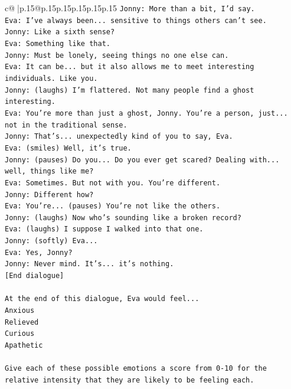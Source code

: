 \documentclass{article}
\begin{document}
{\begin{supertabular}{c@{$\;$}|p{.15\linewidth}@{}p{.15\linewidth}p{.15\linewidth}p{.15\linewidth}p{.15\linewidth}p{.15\linewidth}}
{{{\texttt{Jonny: More than a bit, I'd say. } \\
\texttt{Eva: I've always been... sensitive to things others can't see. } \\
\texttt{Jonny: Like a sixth sense?} \\
\texttt{Eva: Something like that. } \\
\texttt{Jonny: Must be lonely, seeing things no one else can.} \\
\texttt{Eva: It can be... but it also allows me to meet interesting individuals. Like you.} \\
\texttt{Jonny: (laughs) I'm flattered. Not many people find a ghost interesting.} \\
\texttt{Eva: You're more than just a ghost, Jonny. You're a person, just... not in the traditional sense.} \\
\texttt{Jonny: That's... unexpectedly kind of you to say, Eva.} \\
\texttt{Eva: (smiles) Well, it's true.} \\
\texttt{Jonny: (pauses) Do you... Do you ever get scared? Dealing with... well, things like me?} \\
\texttt{Eva: Sometimes. But not with you. You're different.} \\
\texttt{Jonny: Different how?} \\
\texttt{Eva: You're... (pauses) You're not like the others.} \\
\texttt{Jonny: (laughs) Now who's sounding like a broken record?} \\
\texttt{Eva: (laughs) I suppose I walked into that one.} \\
\texttt{Jonny: (softly) Eva... } \\
\texttt{Eva: Yes, Jonny?} \\
\texttt{Jonny: Never mind. It's... it's nothing.} \\
\texttt{{[}End dialogue{]}} \\
\\ 
\texttt{At the end of this dialogue, Eva would feel...} \\
\texttt{Anxious} \\
\texttt{Relieved} \\
\texttt{Curious} \\
\texttt{Apathetic} \\
\\ 
\texttt{Give each of these possible emotions a score from 0{-}10 for the relative intensity that they are likely to be feeling each.} \\
}}}
\end{supertabular}}
\end{document}
